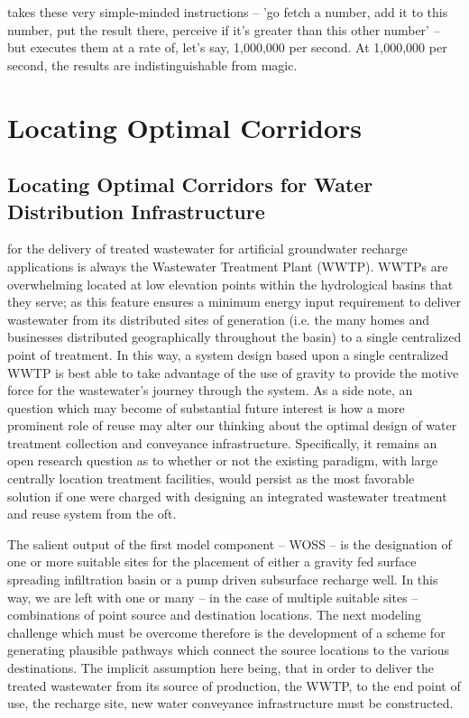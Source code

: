 \begin{savequote}[75mm]
[A computer] takes these very simple-minded instructions -- 'go fetch a number, add it to this number, put the result there, perceive if it's greater than this other number' -- but executes them at a rate of, let's say, 1,000,000 per second. At 1,000,000 per second, the results are indistinguishable from magic.
\end{savequote}

\chapter{Locating Optimal Corridors}
\label{Chapter 2}

\newpage

  \section{Locating Optimal Corridors for Water Distribution Infrastructure}
 
 for the delivery of treated wastewater for artificial groundwater recharge applications is always the Wastewater Treatment Plant (WWTP). WWTPs are overwhelming located at low elevation points within the hydrological basins that they serve; as this feature ensures a minimum energy input requirement to deliver wastewater from its distributed sites of generation (i.e. the many homes and businesses distributed geographically throughout the basin) to a single centralized point of treatment. In this way, a system design based upon a single centralized WWTP is best able to take advantage of the use of gravity to provide the motive force for the wastewater's journey through the system. As a side note, an question which may become of substantial future interest is how a more prominent role of reuse may alter our thinking about the optimal design of water treatment collection and conveyance infrastructure. Specifically, it remains an open research question as to whether or not the existing paradigm, with large centrally location treatment facilities, would persist as the most favorable solution if one were charged with designing an integrated wastewater treatment and reuse system from the oft.
                
The salient output of the first model component -- WOSS -- is the designation of one or more suitable sites for the placement of either a gravity fed surface spreading infiltration basin or a pump driven subsurface recharge well. In this way, we are left with one or many -- in the case of multiple suitable sites -- combinations of point source and destination locations. The next modeling challenge which must be overcome therefore is the development of a scheme for generating plausible pathways which connect the source locations to the various destinations. The implicit assumption here being, that in order to deliver the treated wastewater from its source of production, the WWTP, to the end point of use, the recharge site, new water conveyance infrastructure must be constructed.
        
